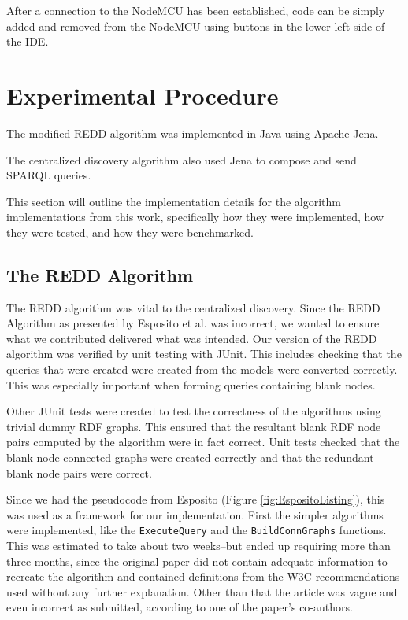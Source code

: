 After a connection to the NodeMCU has been established, code can be simply added and removed from the NodeMCU using buttons in the lower left side of the IDE.

\section{Experimental Procedure}

The modified REDD algorithm was implemented in Java using Apache Jena.

The centralized discovery algorithm also used Jena to compose and send SPARQL queries. 

This section will outline the implementation details for the algorithm implementations from this work, specifically how they were implemented, how they were tested, and how they were benchmarked.

\subsection{The REDD Algorithm}


The REDD algorithm was vital to the centralized discovery. Since the REDD Algorithm as presented by Esposito et al. was incorrect, we wanted to ensure what we contributed delivered what was intended. Our version of the REDD algorithm was verified by unit testing with JUnit. This includes checking that the queries that were created were created from the models were converted correctly. This was especially important when forming queries containing blank nodes.


Other JUnit tests were created to test the correctness of the algorithms using trivial dummy RDF graphs. This ensured that the resultant blank RDF node pairs computed by the algorithm were in fact correct. Unit tests checked that the blank node connected graphs were created correctly and that the redundant blank node pairs were correct.

Since we had the pseudocode from Esposito (Figure \ref{fig:EspositoListing}), this was used as a framework for our implementation. First the simpler algorithms were implemented, like the \texttt{ExecuteQuery} and the \texttt{BuildConnGraphs} functions. This was estimated to take about two weeks--but ended up requiring more than three months, since the original paper did not contain adequate information to recreate the algorithm and contained definitions from the W3C recommendations used without any further explanation. Other than that the article was vague and even incorrect as submitted, according to one of the paper's co-authors.

